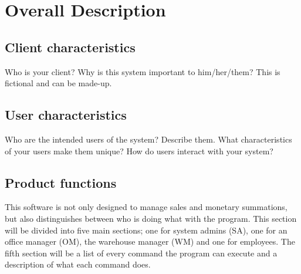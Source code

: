 \documentclass{report}
\begin{document}
\section{Overall Description}
\subsection{Client characteristics}
Who is your client? Why is this system important to him/her/them? This is fictional and can be made-up.\par
\subsection{User characteristics}
Who are the intended users of the system? Describe them. What characteristics of your users make them unique?  How do users interact with your system?\par
\subsection{Product functions}
This software is not only designed to manage sales and monetary summations, but also distinguishes between who is doing what with the program. This section will be divided into five main sections; one for system admins (SA), one for an office manager (OM), the warehouse manager (WM) and one for employees. The fifth section will be a list of every command the program can execute and a description of what each command does.\par
\end{document}
